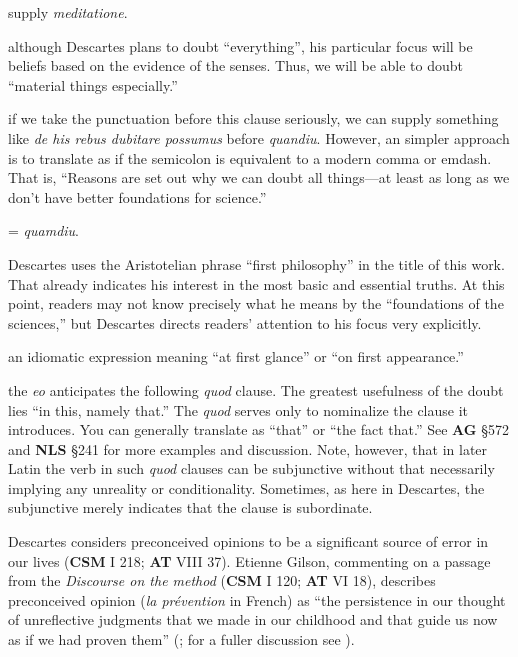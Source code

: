  supply \textit{meditatione}.

 although Descartes plans to doubt ``everything'', his particular focus will be beliefs based on the evidence of the senses. Thus, we will be able to doubt ``material things especially.''

 if we take the punctuation before this clause seriously, we can supply something like \textit{de his rebus dubitare possumus} before \textit{quandiu}. However, an simpler approach is to translate as if the semicolon is equivalent to a modern comma or emdash. That is, ``Reasons are set out why we can doubt all things---at least as long as we don't have better foundations for science.''

 = \textit{quamdiu}.

 Descartes uses the Aristotelian phrase ``first philosophy'' in the title of this work. That already indicates his interest in the most basic and essential truths. At this point, readers may not know precisely what he means by the ``foundations of the sciences,'' but Descartes directs readers' attention to his focus very explicitly.

 an idiomatic expression meaning ``at first glance'' or ``on first appearance.''

 the \textit{eo} anticipates the following \textit{quod} clause. The greatest usefulness of the doubt lies ``in this, namely that.'' The \textit{quod} serves only to nominalize the clause it introduces. You can generally translate as ``that'' or ``the fact that.'' See \textbf{AG} §572 and \textbf{NLS} §241 for more examples and discussion. Note, however, that in later Latin the verb in such \textit{quod} clauses can be subjunctive without that necessarily implying any unreality or conditionality. Sometimes, as here in Descartes, the subjunctive merely indicates that the clause is subordinate.

 Descartes considers preconceived opinions to be a significant source of error in our lives (\textbf{CSM} I 218; \textbf{AT} VIII 37). Etienne Gilson, commenting on a passage from the \textit{Discourse on the method} (\textbf{CSM} I 120; \textbf{AT} VI 18), describes preconceived opinion (\textit{la prévention} in French) as ``the persistence in our thought of unreflective judgments that we made in our childhood and that guide us now as if we had proven them'' (\textcite[199]{gilson2005}; for a fuller discussion see \textcite[199]{gilson1987}).

